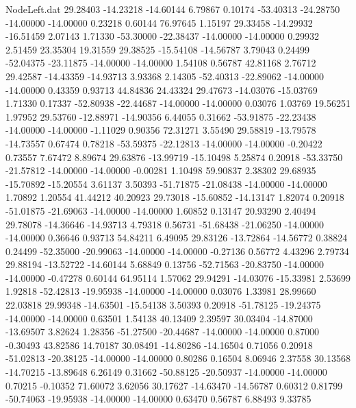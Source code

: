 \begin{filecontents}{NodeLeft.dat}
  29.28403  -14.23218  -14.60144     6.79867    0.10174  -53.40313  -24.28750  -14.00000  -14.00000    0.23218    0.60144   76.97645    1.15197
  29.33458  -14.29932  -16.51459     2.07143    1.71330  -53.30000  -22.38437  -14.00000  -14.00000    0.29932    2.51459   23.35304   19.31559
  29.38525  -15.54108  -14.56787     3.79043    0.24499  -52.04375  -23.11875  -14.00000  -14.00000    1.54108    0.56787   42.81168    2.76712
  29.42587  -14.43359  -14.93713     3.93368    2.14305  -52.40313  -22.89062  -14.00000  -14.00000    0.43359    0.93713   44.84836   24.43324
  29.47673  -14.03076  -15.03769     1.71330    0.17337  -52.80938  -22.44687  -14.00000  -14.00000    0.03076    1.03769   19.56251    1.97952
  29.53760  -12.88971  -14.90356     6.44055    0.31662  -53.91875  -22.23438  -14.00000  -14.00000   -1.11029    0.90356   72.31271    3.55490
  29.58819  -13.79578  -14.73557     0.67474    0.78218  -53.59375  -22.12813  -14.00000  -14.00000   -0.20422    0.73557    7.67472    8.89674
  29.63876  -13.99719  -15.10498     5.25874    0.20918  -53.33750  -21.57812  -14.00000  -14.00000   -0.00281    1.10498   59.90837    2.38302
  29.68935  -15.70892  -15.20554     3.61137    3.50393  -51.71875  -21.08438  -14.00000  -14.00000    1.70892    1.20554   41.44212   40.20923
  29.73018  -15.60852  -14.13147     1.82074    0.20918  -51.01875  -21.69063  -14.00000  -14.00000    1.60852    0.13147   20.93290    2.40494
  29.78078  -14.36646  -14.93713     4.79318    0.56731  -51.68438  -21.06250  -14.00000  -14.00000    0.36646    0.93713   54.84211    6.49095
  29.83126  -13.72864  -14.56772     0.38824    0.24499  -52.35000  -20.99063  -14.00000  -14.00000   -0.27136    0.56772    4.43296    2.79734
  29.88194  -13.52722  -14.60144     5.68849    0.13756  -52.71563  -20.83750  -14.00000  -14.00000   -0.47278    0.60144   64.95114    1.57062
  29.94291  -14.03076  -15.33981     2.53699    1.92818  -52.42813  -19.95938  -14.00000  -14.00000    0.03076    1.33981   28.99660   22.03818
  29.99348  -14.63501  -15.54138     3.50393    0.20918  -51.78125  -19.24375  -14.00000  -14.00000    0.63501    1.54138   40.13409    2.39597
  30.03404  -14.87000  -13.69507     3.82624    1.28356  -51.27500  -20.44687  -14.00000  -14.00000    0.87000   -0.30493   43.82586   14.70187
  30.08491  -14.80286  -14.16504     0.71056    0.20918  -51.02813  -20.38125  -14.00000  -14.00000    0.80286    0.16504    8.06946    2.37558
  30.13568  -14.70215  -13.89648     6.26149    0.31662  -50.88125  -20.50937  -14.00000  -14.00000    0.70215   -0.10352   71.60072    3.62056
  30.17627  -14.63470  -14.56787     0.60312    0.81799  -50.74063  -19.95938  -14.00000  -14.00000    0.63470    0.56787    6.88493    9.33785

\end{filecontents}
